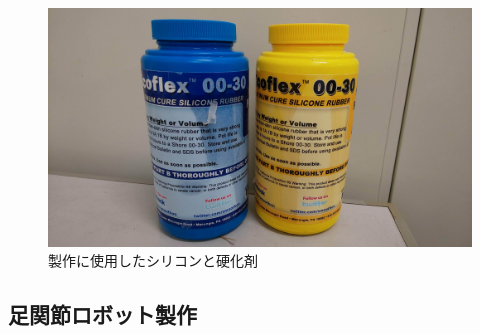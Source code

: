 \begin{figure}[h]
    \begin{center}
        \includegraphics[width=0.7\columnwidth,clip]{./2_measurement/silicon.eps}
        \caption{製作に使用したシリコンと硬化剤}
        \label{fig:silicon}
    \end{center}
\end{figure}

\subsection{足関節ロボット製作}


